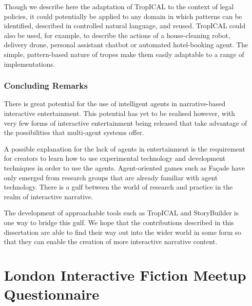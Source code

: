 \documentclass[11pt]{report}
\begin{document}
Though we describe here the adaptation of TropICAL to the context of legal
policies, it could potentially be applied to any domain in which patterns can be
identified, described in controlled natural language, and reused. TropICAL
could also be used, for example, to describe the actions of a house-cleaning robot,
delivery drone, personal assistant chatbot or automated hotel-booking agent. The
simple, pattern-based nature of tropes make them easily adaptable to a range of implementations.

\subsection{Concluding Remarks}
There is great potential for the use of intelligent agents in narrative-based
interactive entertainment. This potential has yet to be realised however, with
very few forms of interactive entertainment being released that take advantage
of the possibilities that multi-agent systems offer.

A possible explanation for the lack of agents in entertainment is the
requirement for creators to learn how to use experimental technology and
development techniques in order to use the agents. Agent-oriented games such as
Fa\c{c}ade have only emerged from research groups that are already familiar with
agent technology. There is a gulf between the world of research and practice in
the realm of interactive narrative.

The development of approachable tools such as TropICAL and StoryBuilder is one way to bridge
this gulf. We hope that the contributions described in this dissertation are
able to find their way out into the wider world in some form so that they can
enable the creation of more interactive narrative content.


\appendix

\chapter{London Interactive Fiction Meetup Questionnaire}
\label{appendix:questionnaire}
\end{document}
